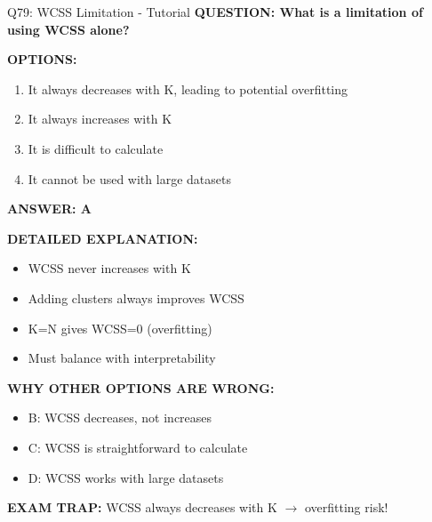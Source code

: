 \documentclass[8pt]{beamer}
\begin{document}
	\begin{frame}{Q79: WCSS Limitation - Tutorial}
		\fontsize{6.5}{7.5}\selectfont
		\textbf{QUESTION: What is a limitation of using WCSS alone?}
		
		\vspace{0.1cm}
		\textbf{OPTIONS:}
		\begin{enumerate}
			\item It always decreases with K, leading to potential overfitting
			\item It always increases with K
			\item It is difficult to calculate
			\item It cannot be used with large datasets
		\end{enumerate}
		
		\vspace{0.1cm}
		\textcolor{myblue}{\textbf{ANSWER: A}}
		
		\vspace{0.1cm}
		\textbf{DETAILED EXPLANATION:}
		\begin{itemize}
			\item WCSS never increases with K
			\item Adding clusters always improves WCSS
			\item K=N gives WCSS=0 (overfitting)
			\item Must balance with interpretability
		\end{itemize}
		
		\vspace{0.1cm}
		\textcolor{myred}{\textbf{WHY OTHER OPTIONS ARE WRONG:}}
		\begin{itemize}
			\item \textcolor{myred}{B:} WCSS decreases, not increases
			\item \textcolor{myred}{C:} WCSS is straightforward to calculate
			\item \textcolor{myred}{D:} WCSS works with large datasets
		\end{itemize}
		
		\textcolor{myred}{\textbf{EXAM TRAP:}} WCSS always decreases with K $\to$ \textcolor{myblue}{overfitting risk}!
	\end{frame}
	
\end{document}

